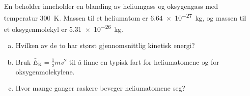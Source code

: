 %
En beholder inneholder en blanding av heliumgass og oksygengass med temperatur \SI{300}{\kelvin}. Massen til et heliumatom er \SI{6.64e-27}{\kilo\gram}, og massen til et oksygenmolekyl er \SI{5.31e-26}{\kilo\gram}.
\begin{enumerate}[a)]
    \item Hvilken av de to har størst gjennomsnittlig kinetisk energi?
    \item Bruk $\bar{E}_\text{K} = \tfrac{1}{2}mv^2$ til å finne en typisk fart for heliumatomene og for oksygenmolekylene.
    \item Hvor mange ganger raskere beveger heliumatomene seg?
\end{enumerate}
%
